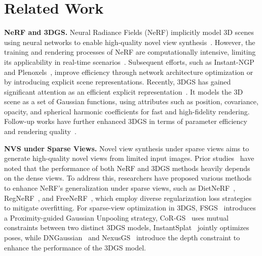 \section{Related Work}

\noindent\textbf{NeRF and 3DGS.}
Neural Radiance Fields (NeRF) implicitly model 3D scenes using neural networks to enable high-quality novel view synthesis~\cite{mildenhall2020nerf,mueller2022instant,barron2021mip,zhang2022ray,atzmon2019controlling,mescheder2019occupancy,michalkiewicz2019implicit,niemeyer2019occupancy,oechsle2019texture,park2019deepsdf,peng2020convolutional,lindell2021autoint,sun2022direct}. However, the training and rendering processes of NeRF are computationally intensive, limiting its applicability in real-time scenarios~\cite{picard2023survey,fang2023pvd,reiser2021kilonerf,garbin2021fastnerf,xu2022point-nerf,wang2024uavenerf,martinbrualla2020nerfw,lee2024sharp,fang2023dn2n}. Subsequent efforts, such as Instant-NGP~\cite{mueller2022instant} and Plenoxels~\cite{fridovich2022plenoxels}, improve efficiency through network architecture optimization or by introducing explicit scene representations. Recently, 3DGS has gained significant attention as an efficient explicit representation~\cite{kerbl2023-3dgs,malarz2023-vdgs,lu2024scaffold,huang20242dgs,jiang2024gaussianshader,gao2023relightable,mihajlovic2025splatfields,jung2024relaxing,yang2024gaussianobject}. It models the 3D scene as a set of Gaussian functions, using attributes such as position, covariance, opacity, and spherical harmonic coefficients for fast and high-fidelity rendering. Follow-up works have further enhanced 3DGS in terms of parameter efficiency and rendering quality~\cite{yu2024mip-gs,chen2025hac,lu2024scaffold,liu2024comp-gs,chen2025mvsplat,huang20242dgs,malarz2023-vdgs,chen2024survey-3dgs,bag20243dgs-comp-survey,das2024NPGs,foroutan2024-NerfInit, niemeyer2024radsplat,lee2024compact-3dgs}.

\vspace{1mm}
\noindent\textbf{NVS under Sparse Views.}
Novel view synthesis under sparse views aims to generate high-quality novel views from limited input images. Prior studies~\cite{wang2023sparsenerf,mihajlovic2025splatfields,barron2022mipnerf-360,jain2021dietnerf,niemeyer2022regnerf,colmapfree3dgs,yang2023freenerf} have noted that the performance of both NeRF and 3DGS methods heavily depends on the dense views. To address this, researchers have proposed various methods to enhance NeRF's generalization under sparse views, such as DietNeRF~\cite{jain2021dietnerf}, RegNeRF~\cite{niemeyer2022regnerf}, and FreeNeRF~\cite{yang2023freenerf}, which employ diverse regularization loss strategies to mitigate overfitting. For sparse-view optimization in 3DGS, FSGS~\cite{zhu2024fsgs} introduces a Proximity-guided Gaussian Unpooling strategy, CoR-GS~\cite{zhang2024corgs} uses mutual constraints between two distinct 3DGS models, InstantSplat~\cite{fan2024instantsplat} jointly optimizes poses, while DNGaussian~\cite{li2024dngaussian} and  NexusGS~\cite{zheng2025nexusgs} introduce the depth constraint to enhance the performance of the 3DGS model.
%

